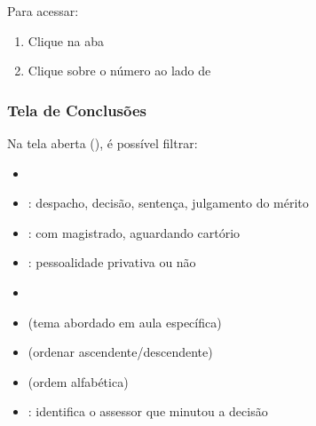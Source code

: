 \documentclass[letterpaper,10pt,brazil]{sphinxmanual}
\begin{document}
\sphinxAtStartPar
Para acessar:
\begin{enumerate}
%
\item {} 
\sphinxAtStartPar
Clique na aba 

\item {} 
\sphinxAtStartPar
Clique sobre o número ao lado de 

\end{enumerate}


\subsubsection{Tela de Conclusões}
\label{\detokenize{projud_07_analisejuntada_multiplaeunitariaconclusos:tela-de-conclusoes}}
\sphinxAtStartPar
Na tela aberta (), é possível filtrar:
\begin{itemize}
\item {} 
\sphinxAtStartPar
{}

\item {} 
\sphinxAtStartPar
{}: despacho, decisão, sentença, julgamento do mérito

\item {} 
\sphinxAtStartPar
{}: com magistrado, aguardando cartório

\item {} 
\sphinxAtStartPar
{}: pessoalidade privativa ou não

\item {} 
\sphinxAtStartPar
{}

\item {} 
\sphinxAtStartPar
{} (tema abordado em aula específica)

\item {} 
\sphinxAtStartPar
{} (ordenar ascendente/descendente)

\item {} 
\sphinxAtStartPar
{} (ordem alfabética)

\item {} 
\sphinxAtStartPar
{}: identifica o assessor que minutou a decisão

\end{itemize}
\end{document}
